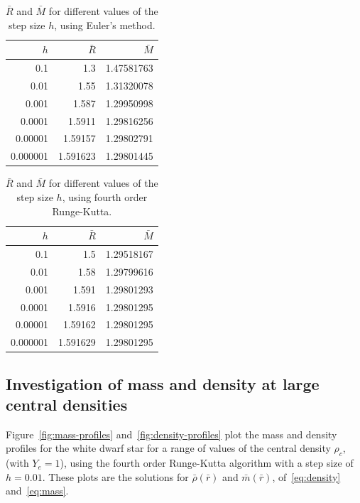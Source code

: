 \documentclass[a4paper]{IEEEtran}
\begin{document}
    \begin{table}
    \caption{$\bar{R}$ and $\bar{M}$ for different values of the 
             step size $h$, using Euler's method.} 
    \label{tbl:R-M-euler}
    \begin{center}
    \begin{tabular}{r|rr} \hline
    $h$         &   $\bar{R}$   &   $\bar{M}$       \\ \hline
    0.1         &   1.3         &   1.47581763      \\ 
    0.01        &   1.55        &   1.31320078      \\ 
    0.001       &   1.587       &   1.29950998      \\ 
    0.0001      &   1.5911      &   1.29816256      \\ 
    0.00001     &   1.59157     &   1.29802791      \\ 
    0.000001    &   1.591623    &   1.29801445      \\ \hline   
    \end{tabular}
    \end{center}
    \end{table} 

    \begin{table}
    \caption{$\bar{R}$ and $\bar{M}$ for different values of the step 
             size $h$, using fourth order Runge-Kutta.}
    \label{tbl:R-M-runge-kutta} 
    \begin{center}
    \begin{tabular}{r|rr} \hline
    $h$         &   $\bar{R}$   &   $\bar{M}$       \\ \hline
    0.1         &   1.5         &   1.29518167      \\ 
    0.01        &   1.58        &   1.29799616      \\ 
    0.001       &   1.591       &   1.29801293      \\ 
    0.0001      &   1.5916      &   1.29801295      \\ 
    0.00001     &   1.59162     &   1.29801295      \\ 
    0.000001    &   1.591629    &   1.29801295      \\ \hline
    \end{tabular}
    \end{center}
    \end{table} 

    \subsection{Investigation of mass and density at large central densities}
    Figure~\ref{fig:mass-profiles} and~\ref{fig:density-profiles} 
    plot the mass and density profiles for
    the white dwarf star for a range of values of the central density $\rho_c$,
    (with $Y_e = 1$), using the fourth order Runge-Kutta algorithm with
    a step size of $h = 0.01$.
    These plots are the solutions for $\bar{\rho}(\bar{r})$ and $\bar{m}(\bar{r})$,
    of~\ref{eq:density} and~\ref{eq:mass}.
\end{document}
